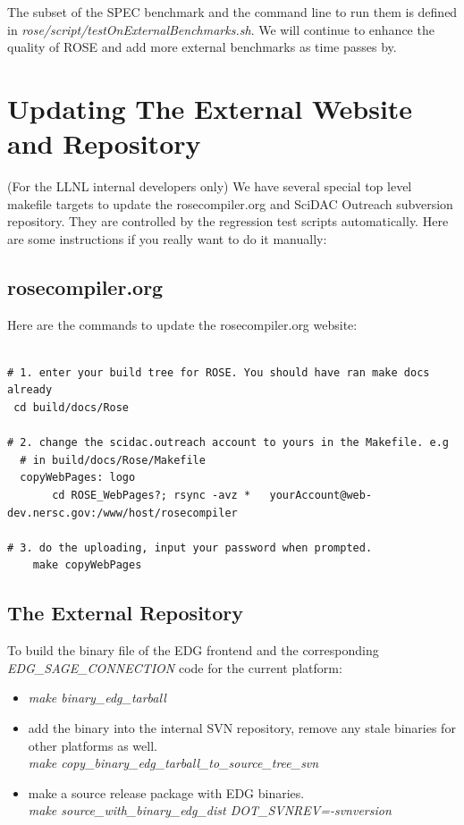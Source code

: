 The subset of the SPEC
benchmark and the command line to run them is defined in
\textit{rose/script/testOnExternalBenchmarks.sh}. 
We will continue to enhance the quality of ROSE and add more external
benchmarks as time passes by. 


\section{Updating The External Website and Repository}%
(For the LLNL internal developers only) We have several special top level
makefile targets to update the rosecompiler.org and SciDAC Outreach
subversion repository. They are controlled by the regression test scripts
automatically. Here are some instructions if you really want to do it manually:

\subsection{rosecompiler.org}
Here are the commands to update the rosecompiler.org website:
\begin{verbatim}

# 1. enter your build tree for ROSE. You should have ran make docs already
 cd build/docs/Rose

# 2. change the scidac.outreach account to yours in the Makefile. e.g 
  # in build/docs/Rose/Makefile
  copyWebPages: logo
       cd ROSE_WebPages?; rsync -avz *   yourAccount@web-dev.nersc.gov:/www/host/rosecompiler

# 3. do the uploading, input your password when prompted. 
    make copyWebPages  
\end{verbatim}

\subsection{The External Repository}
To build the binary file of the EDG frontend and the corresponding
\textit{EDG\_SAGE\_CONNECTION} code for the current platform:

\begin{itemize}
  \item  \textit{make binary\_edg\_tarball} 
  \item  add the binary into the internal SVN repository, remove any stale
  binaries for other platforms as well. \\
  \textit{make copy\_binary\_edg\_tarball\_to\_source\_tree\_svn} 
   \item make a source release package with EDG binaries. \\
   \textit{make source\_with\_binary\_edg\_dist  DOT\_SVNREV=-svnversion} 
\end{itemize}   

